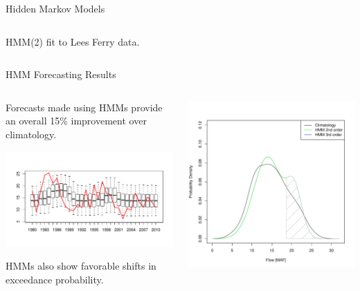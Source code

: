 \documentclass[final,x11names]{beamer}
\begin{document}
\begin{frame}{}
\begin{columns}
\begin{column}{.33\linewidth}
\begin{block}{Hidden Markov Models}
\begin{columns}
\begin{column}{.38\textwidth}
					HMM(2) fit to Lees Ferry data. 
				\end{column}
			\end{columns}
		\end{block}
		
		\begin{block}{HMM Forecasting Results}
			\begin{columns}
				\begin{column}{.58\textwidth}
				
					Forecasts made using {\color{orange}HMMs provide an overall 15\% improvement
					over climatology}. 
					\centerline{\includegraphics[width=\textwidth]{figs/hmm-order-2.pdf}}
					
					HMMs also show favorable shifts in exceedance probability.
				\end{column}
				\begin{column}{.38\textwidth}
					\centerline{\includegraphics[width=\textwidth]{figs/pdf-shift1984.pdf}}
					

\end{column}
\end{columns}
\end{block}
\end{column}
\end{columns}
\end{frame}
\end{document}
